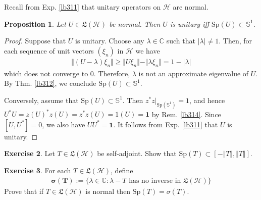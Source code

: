 \documentclass[12pt,b5paper,notitlepage]{article}
\theoremstyle{definition}
\newtheorem{df}{Definition}[subsection]
\newtheorem{exe}[df]{Exercise}
\theoremstyle{plain}
\newtheorem{pp}[df]{Proposition}
\newcommand{\fk}{\mathfrak}
\newcommand{\idt}{\mathbf{1}}
\newcommand{\Cbb}{\mathbb C}
\newcommand{\Sp}{\mathrm{Sp}}
\newcommand{\Sbb}{{\mathbb S}}
\newcommand{\Fbb}{\mathbb F}
\newcommand{\Lin}{\mathrm{Lin}}
\newcommand{\MH}{\mathcal H}
\numberwithin{equation}{section}
\begin{document}
Recall from Exp. \ref{lb311} that unitary operators on $\MH$ are normal.

\begin{pp}\label{lb315}
Let $U\in\fk L(\MH)$ be normal. Then $U$ is unitary iff $\Sp(U)\subset\Sbb^1$.
\end{pp}

\begin{proof}
Suppose that $U$ is unitary. Choose any $\lambda\in\Cbb$ such that $|\lambda|\neq 1$. Then, for each sequence of unit vectors $(\xi_n)$ in $\MH$ we have
\begin{align*}
\Vert (U-\lambda)\xi_n\Vert\geq \Vert U\xi_n\Vert-\Vert\lambda\xi_n\Vert=1-|\lambda|
\end{align*}
which does not converge to $0$. Therefore, $\lambda$ is not an approximate eigenvalue of $U$. By Thm. \ref{lb312}, we conclude $\Sp(U)\subset\Sbb^1$.

Conversely, assume that $\Sp(U)\subset\Sbb^1$. Then $z^*z|_{\Sp(\Sbb^1)}=1$, and hence $U^*U=z(U)^*z(U)=z^*z(U)=1(U)=\idt$ by Rem. \ref{lb314}. Since $[U,U^*]=0$, we also have $UU^*=\idt$. It follows from Exp. \ref{lb311} that $U$ is unitary.
\end{proof}


\begin{exe}
Let $T\in\fk L(\MH)$ be self-adjoint. Show that $\Sp(T)\subset[-\Vert T\Vert,\Vert T\Vert]$.
\end{exe}

\begin{exe}
For each $T\in\fk L(\MH)$, define
\begin{align*}
\pmb{\sigma(T)}:=\{\lambda\in\Cbb:\lambda-T\text{ has no inverse in }\fk L(\MH)\}
\end{align*}
Prove that if $T\in\fk L(\MH)$ is normal then $\Sp(T)=\sigma(T)$.
\end{exe}






\begin{comment}
\begin{df}
Let $V$ is an $\Fbb$-vector space $T\in\Lin(V)$. Let $\lambda\in\Fbb$. We say that $\xi\in V$ is an \textbf{$\pmb\lambda$-eigenvector} of $T$ if $T\xi=\lambda\xi$. If there exists a non-zero $\lambda$-eigenvector of $T$, we say that $\lambda$ is an \textbf{eigenvalue} of $T$. \index{00@Eigenvalues and eigenvectors}
\end{df}
\end{comment}
\end{document}
